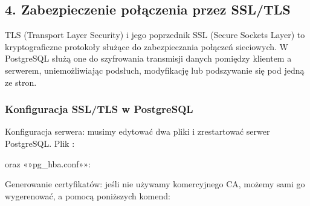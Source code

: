 \documentclass[letterpaper,10pt,polish]{sphinxmanual}
\begin{document}
\subsection{4. Zabezpieczenie połączenia przez SSL/TLS}
\label{\detokenize{rozdzial2/bezpieczenstwo/index:zabezpieczenie-polaczenia-przez-ssl-tls}}
\sphinxAtStartPar
TLS (Transport Layer Security) i jego poprzednik SSL (Secure Sockets Layer) to kryptograficzne protokoły służące do zabezpieczania połączeń sieciowych. W PostgreSQL służą one do szyfrowania transmisji danych pomiędzy klientem a serwerem, uniemożliwiając podsłuch, modyfikację lub podszywanie się pod jedną ze stron.


\subsubsection{Konfiguracja SSL/TLS w PostgreSQL}
\label{\detokenize{rozdzial2/bezpieczenstwo/index:konfiguracja-ssl-tls-w-postgresql}}
\sphinxAtStartPar
Konfiguracja serwera: musimy edytować dwa pliki i zrestartować serwer PostgreSQL. Plik :

\begin{sphinxVerbatim}[commandchars=\\\{\}]
  
  
  
  
  
\end{sphinxVerbatim}

\sphinxAtStartPar
oraz «»pg\_hba.conf»»:

\begin{sphinxVerbatim}[commandchars=\\\{\}]
    
\end{sphinxVerbatim}

\sphinxAtStartPar
Generowanie certyfikatów: jeśli nie używamy komercyjnego CA, możemy sami go wygerenować, a pomocą poniższych komend:
\end{document}
